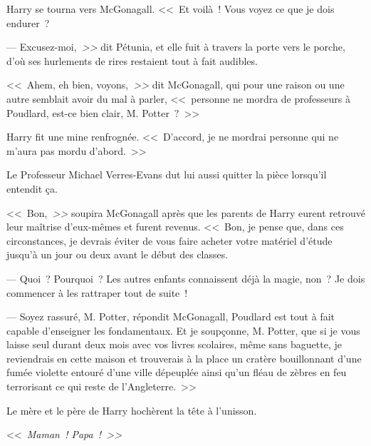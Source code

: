 Harry se tourna vers McGonagall. <<~Et voilà~! Vous voyez ce que je dois endurer~?

--- Excusez-moi,\emph{~>>} dit Pétunia, et elle fuit à travers la porte vers le porche, d'où ses hurlements de rires restaient tout à fait audibles.

<<~Ahem, eh bien, voyons,\emph{~>>} dit McGonagall, qui pour une raison ou une autre semblait avoir du mal à parler, <<~personne ne mordra de professeurs à Poudlard, est-ce bien clair, M. Potter~?~>>

Harry fit une mine renfrognée. <<~D'accord, je ne mordrai personne qui ne m'aura pas mordu d'abord.~>>

Le Professeur Michael Verres-Evans dut lui aussi quitter la pièce lorsqu'il entendit ça.

<<~Bon,\emph{~>>} soupira McGonagall après que les parents de Harry eurent retrouvé leur maîtrise d'eux-mêmes et furent revenus. <<~Bon, je pense que, dans ces circonstances, je devrais éviter de vous faire acheter votre matériel d'étude jusqu'à un jour ou deux avant le début des classes.

--- Quoi~? Pourquoi~? Les autres enfants connaissent déjà la magie, non~? Je dois commencer à les rattraper tout de suite~!

--- Soyez rassuré, M. Potter, répondit McGonagall, Poudlard est tout à fait capable d'enseigner les fondamentaux. Et je soupçonne, M. Potter, que si je vous laisse seul durant deux mois avec vos livres scolaires, même sans baguette, je reviendrais en cette maison et trouverais à la place un cratère bouillonnant d'une fumée violette entouré d'une ville dépeuplée ainsi qu'un fléau de zèbres en feu terrorisant ce qui reste de l'Angleterre.~>>

Le mère et le père de Harry hochèrent la tête à l'unisson.

<<~\emph{Maman~! Papa~!~>>}
